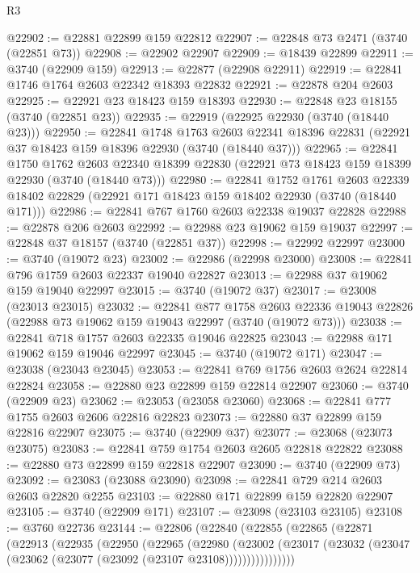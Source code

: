 \begin{lexlean}{R3}
\begin{coremodule}
@22902 := @22881 @22899 @159 @22812
@22907 := @22848 @73 @2471 (@3740 (@22851 @73))
@22908 := @22902 @22907
@22909 := @18439 @22899
@22911 := @3740 (@22909 @159)
@22913 := @22877 (@22908 @22911)
@22919 := @22841 @1746 @1764 @2603 @22342 @18393 @22832
@22921 := @22878 @204 @2603
@22925 := @22921 @23 @18423 @159 @18393
@22930 := @22848 @23 @18155 (@3740 (@22851 @23))
@22935 := @22919 (@22925 @22930 (@3740 (@18440 @23)))
@22950 := @22841
    @1748
    @1763
    @2603
    @22341
    @18396
    @22831
    (@22921 @37 @18423 @159 @18396 @22930 (@3740 (@18440 @37)))
@22965 := @22841
    @1750
    @1762
    @2603
    @22340
    @18399
    @22830
    (@22921 @73 @18423 @159 @18399 @22930 (@3740 (@18440 @73)))
@22980 := @22841
    @1752
    @1761
    @2603
    @22339
    @18402
    @22829
    (@22921 @171 @18423 @159 @18402 @22930 (@3740 (@18440 @171)))
@22986 := @22841 @767 @1760 @2603 @22338 @19037 @22828
@22988 := @22878 @206 @2603
@22992 := @22988 @23 @19062 @159 @19037
@22997 := @22848 @37 @18157 (@3740 (@22851 @37))
@22998 := @22992 @22997
@23000 := @3740 (@19072 @23)
@23002 := @22986 (@22998 @23000)
@23008 := @22841 @796 @1759 @2603 @22337 @19040 @22827
@23013 := @22988 @37 @19062 @159 @19040 @22997
@23015 := @3740 (@19072 @37)
@23017 := @23008 (@23013 @23015)
@23032 := @22841
    @877
    @1758
    @2603
    @22336
    @19043
    @22826
    (@22988 @73 @19062 @159 @19043 @22997 (@3740 (@19072 @73)))
@23038 := @22841 @718 @1757 @2603 @22335 @19046 @22825
@23043 := @22988 @171 @19062 @159 @19046 @22997
@23045 := @3740 (@19072 @171)
@23047 := @23038 (@23043 @23045)
@23053 := @22841 @769 @1756 @2603 @2624 @22814 @22824
@23058 := @22880 @23 @22899 @159 @22814 @22907
@23060 := @3740 (@22909 @23)
@23062 := @23053 (@23058 @23060)
@23068 := @22841 @777 @1755 @2603 @2606 @22816 @22823
@23073 := @22880 @37 @22899 @159 @22816 @22907
@23075 := @3740 (@22909 @37)
@23077 := @23068 (@23073 @23075)
@23083 := @22841 @759 @1754 @2603 @2605 @22818 @22822
@23088 := @22880 @73 @22899 @159 @22818 @22907
@23090 := @3740 (@22909 @73)
@23092 := @23083 (@23088 @23090)
@23098 := @22841 @729 @214 @2603 @2603 @22820 @2255
@23103 := @22880 @171 @22899 @159 @22820 @22907
@23105 := @3740 (@22909 @171)
@23107 := @23098 (@23103 @23105)
@23108 := @3760 @22736
@23144 := @22806
    (@22840
      (@22855
        (@22865
          (@22871
            (@22913
              (@22935
                (@22950
                  (@22965
                    (@22980
                      (@23002
                        (@23017
                          (@23032 (@23047 (@23062 (@23077 (@23092 (@23107 @23108))))))))))))))))

\end{coremodule}
\end{lexlean}
